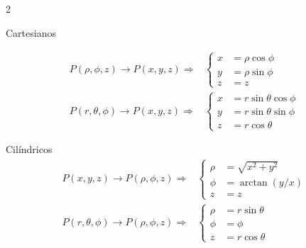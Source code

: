               \begin{multicols}{2}

                
  
                \begin{itemform}[leftmargin=*,noitemsep,topsep=0pt]
                \item Cartesianos

                  $$
                  \begin{aligned}
                    P(\rho,\phi,z) \to P(x,y,z) \Rightarrow &\left\{
                      \begin{aligned}
                        x&= \rho \cos \phi \\
                        y&= \rho \sin \phi \\
                        z&=z
                      \end{aligned} \right. \\
                      P(r,\theta, \phi) \to P(x,y,z) \Rightarrow &\left\{
                        \begin{aligned}
                          x&= r \sin \theta \cos \phi\\
                          y&= r \sin \theta \sin \phi\\
                          z&= r \cos \theta
                        \end{aligned} \right.
                      \end{aligned}
                      $$

                    \item Cilíndricos
                      $$
                      \begin{aligned}
                        P(x,y,z) \to P(\rho,\phi,z) \Rightarrow
                        &\left\{
                          \begin{aligned}
                            \rho &= \sqrt{x^2+y^2}\\
                            \phi &= \arctan(y/x)\\
                            z&=z
                          \end{aligned} \right. \\
                          P(r,\theta,\phi) \to P(\rho,\phi,z) \Rightarrow
                          &\left\{
                            \begin{aligned}
                              \rho &= r \sin \theta\\
                              \phi &= \phi \\
                              z&= r \cos \theta
                            \end{aligned} \right.
                          \end{aligned}
                          $$


\end{itemform}
\end{multicols}
